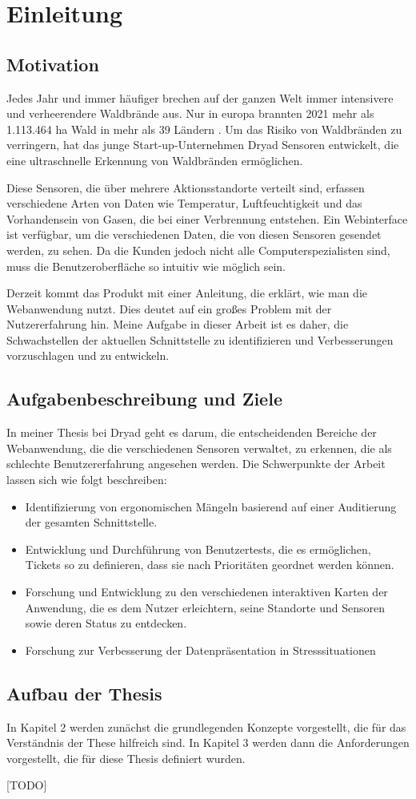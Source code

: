 \chapter{Einleitung}

\section{Motivation}

Jedes Jahr und immer häufiger brechen auf der ganzen Welt immer intensivere und verheerendere Waldbrände aus.
Nur in europa brannten 2021 mehr als 1.113.464 ha Wald in mehr als 39 Ländern \cite{JRC}.
Um das Risiko von Waldbränden zu verringern, hat das junge Start-up-Unternehmen Dryad Sensoren entwickelt, die eine ultraschnelle Erkennung von Waldbränden ermöglichen.

Diese Sensoren, die über mehrere Aktionsstandorte verteilt sind, erfassen verschiedene Arten von Daten wie Temperatur, Luftfeuchtigkeit und das Vorhandensein von Gasen, die bei einer Verbrennung entstehen.
Ein Webinterface ist verfügbar, um die verschiedenen Daten, die von diesen Sensoren gesendet werden, zu sehen.
Da die Kunden jedoch nicht alle Computerspezialisten sind, muss die Benutzeroberfläche so intuitiv wie möglich sein.

Derzeit kommt das Produkt mit einer Anleitung, die erklärt, wie man die Webanwendung nutzt. Dies deutet auf ein großes Problem mit der Nutzererfahrung hin.
Meine Aufgabe in dieser Arbeit ist es daher, die Schwachstellen der aktuellen Schnittstelle zu identifizieren und Verbesserungen vorzuschlagen und zu entwickeln.

\section{Aufgabenbeschreibung und Ziele}

In meiner Thesis bei Dryad geht es darum, die entscheidenden Bereiche der Webanwendung, die die verschiedenen Sensoren verwaltet, zu erkennen, die als schlechte Benutzererfahrung angesehen werden.
Die Schwerpunkte der Arbeit lassen sich wie folgt beschreiben:

\begin{itemize}
  \item Identifizierung von ergonomischen Mängeln basierend auf einer Auditierung der gesamten Schnittstelle.
  \item Entwicklung und Durchführung von Benutzertests, die es ermöglichen, Tickets so zu definieren, dass sie nach Prioritäten geordnet werden können.
  \item Forschung und Entwicklung zu den verschiedenen interaktiven Karten der Anwendung, die es dem Nutzer erleichtern, seine Standorte und Sensoren sowie deren Status zu entdecken.
  \item Forschung zur Verbesserung der Datenpräsentation in Stresssituationen
\end{itemize}

\section{Aufbau der Thesis}

In Kapitel 2 werden zunächst die grundlegenden Konzepte vorgestellt, die für das Verständnis der These hilfreich sind. In Kapitel 3 werden dann die Anforderungen vorgestellt, die für diese Thesis definiert wurden.

  [TODO]